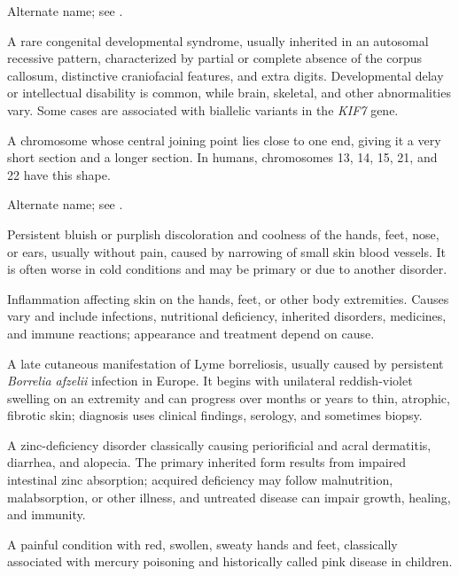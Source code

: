  Alternate name; see .

 A rare congenital developmental syndrome, usually inherited in an
autosomal recessive pattern, characterized by partial or complete absence of the corpus callosum,
distinctive craniofacial features, and extra digits. Developmental delay or intellectual disability
is common, while brain, skeletal, and other abnormalities vary. Some cases are associated with
biallelic variants in the \textit{KIF7} gene.

 A chromosome whose central joining point lies close to one end, giving it a very short section and a longer section. In humans, chromosomes 13, 14, 15, 21, and 22 have this shape.

 Alternate name; see .

 Persistent bluish or purplish discoloration and coolness of the hands, feet, nose, or ears, usually without pain, caused by narrowing of small skin blood vessels. It is often worse in cold conditions and may be primary or due to another disorder.

 Inflammation affecting skin on the hands, feet, or other body extremities. Causes vary and include infections, nutritional deficiency, inherited disorders, medicines, and immune reactions; appearance and treatment depend on cause.

 A late cutaneous manifestation of Lyme borreliosis, usually caused by persistent \textit{Borrelia afzelii} infection in Europe. It begins with unilateral reddish-violet swelling on an extremity and can progress over months or years to thin, atrophic, fibrotic skin; diagnosis uses clinical findings, serology, and sometimes biopsy.

 A zinc-deficiency disorder classically causing periorificial and acral dermatitis, diarrhea, and alopecia. The primary inherited form results from impaired intestinal zinc absorption; acquired deficiency may follow malnutrition, malabsorption, or other illness, and untreated disease can impair growth, healing, and immunity.

 A painful condition with red, swollen, sweaty hands and feet, classically associated with mercury poisoning and historically called pink disease in children.

